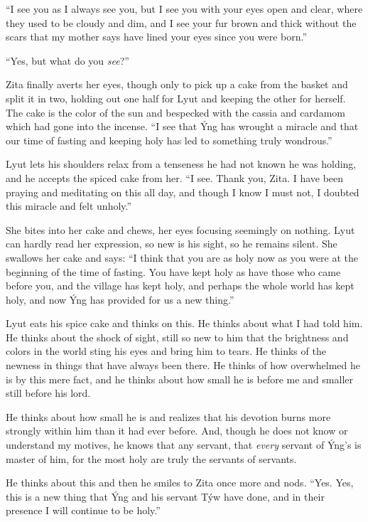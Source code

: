 ``I see you as I always see you, but I see you with your eyes open and clear, where they used to be cloudy and dim, and I see your fur brown and thick without the scars that my mother says have lined your eyes since you were born.''

``Yes, but what do you \emph{see}?''

Zita finally averts her eyes, though only to pick up a cake from the basket and split it in two, holding out one half for Lyut and keeping the other for herself. The cake is the color of the sun and bespecked with the cassia and cardamom which had gone into the incense. ``I see that Ýng has wrought a miracle and that our time of fasting and keeping holy has led to something truly wondrous.''

Lyut lets his shoulders relax from a tenseness he had not known he was holding, and he accepts the spiced cake from her. ``I see. Thank you, Zita. I have been praying and meditating on this all day, and though I know I must not, I doubted this miracle and felt unholy.''

She bites into her cake and chews, her eyes focusing seemingly on nothing. Lyut can hardly read her expression, so new is his sight, so he remains silent. She swallows her cake and says: ``I think that you are as holy now as you were at the beginning of the time of fasting. You have kept holy as have those who came before you, and the village has kept holy, and perhaps the whole world has kept holy, and now Ýng has provided for us a new thing.''

Lyut eats his spice cake and thinks on this. He thinks about what I had told him. He thinks about the shock of sight, still so new to him that the brightness and colors in the world sting his eyes and bring him to tears. He thinks of the newness in things that have always been there. He thinks of how overwhelmed he is by this mere fact, and he thinks about how small he is before me and smaller still before his lord.

He thinks about how small he is and realizes that his devotion burns more strongly within him than it had ever before. And, though he does not know or understand my motives, he knows that any servant, that \emph{every} servant of Ýng's is master of him, for the most holy are truly the servants of servants.

He thinks about this and then he smiles to Zita once more and nods. ``Yes. Yes, this is a new thing that Ýng and his servant Týw have done, and in their presence I will continue to be holy.''

